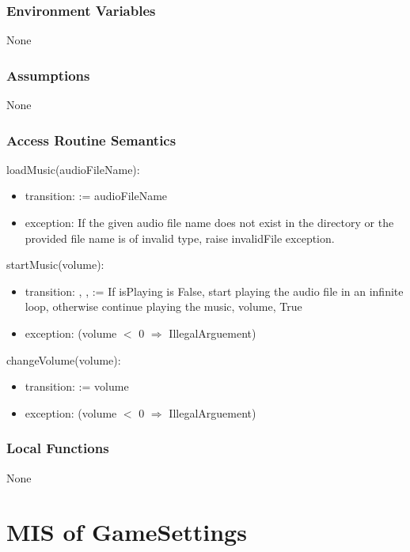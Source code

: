 \documentclass[12pt, titlepage]{article}
\begin{document}
\subsubsection{Environment Variables}

None

\subsubsection{Assumptions}

None

\subsubsection{Access Routine Semantics}

\noindent loadMusic(audioFileName):
\begin{itemize}
\item transition:  := audioFileName
\item exception: If the given audio file name does not exist in the directory or the provided file name is of invalid type, raise invalidFile exception.
\end{itemize}

\noindent startMusic(volume):
\begin{itemize}
\item transition: , ,  := If isPlaying is False, start playing the audio file in an infinite loop, otherwise continue playing the music, volume, True \\
\item exception: (volume $<$ 0 $\Rightarrow$ IllegalArguement)
\end{itemize}

\noindent changeVolume(volume):
\begin{itemize}
\item transition:  := volume
\item exception: (volume $<$ 0 $\Rightarrow$ IllegalArguement)
\end{itemize}

\subsubsection{Local Functions}

None

\medskip
\newpage
\section{MIS of GameSettings} 
\end{document}
